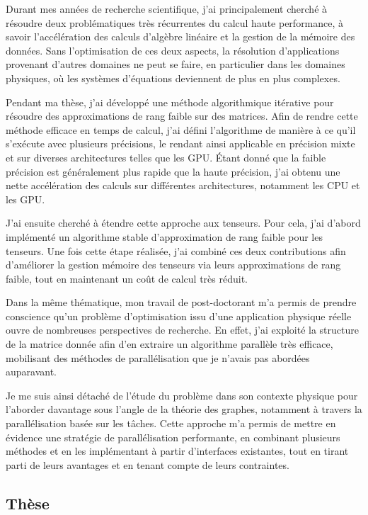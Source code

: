 
\noindent Durant mes années de recherche scientifique, j'ai principalement cherché à
résoudre deux problématiques très récurrentes du calcul haute performance, à
savoir l'accélération des calculs d'algèbre linéaire et la gestion de la
mémoire des données. Sans l'optimisation de ces deux aspects, la
résolution d'applications provenant d'autres domaines ne peut se faire,
en particulier dans les domaines physiques, où les systèmes d'équations
deviennent de plus en plus complexes.

Pendant ma thèse, j'ai développé une méthode algorithmique itérative pour
résoudre des approximations de rang faible sur des matrices. Afin de rendre
cette méthode efficace en temps de calcul, j'ai défini l'algorithme de manière
à ce qu'il s'exécute avec plusieurs précisions, le rendant ainsi applicable en
précision mixte et sur diverses architectures telles que les GPU. Étant donné
que la faible précision est généralement plus rapide que la haute précision,
j'ai obtenu une nette accélération des calculs sur différentes architectures,
notamment les CPU et les GPU.

J'ai ensuite cherché à étendre cette approche aux tenseurs. Pour cela, j'ai
d'abord implémenté un algorithme stable d'approximation de rang faible pour les
tenseurs. Une fois cette étape réalisée, j'ai combiné ces deux contributions
afin d'améliorer la gestion mémoire des tenseurs via leurs approximations de
rang faible, tout en maintenant un coût de calcul très réduit.

Dans la même thématique, mon travail de post-doctorant m'a permis de prendre
conscience qu'un problème d'optimisation issu d'une application physique réelle
ouvre de nombreuses perspectives de recherche. En effet, j'ai exploité la
structure de la matrice donnée afin d'en extraire un algorithme parallèle très
efficace, mobilisant des méthodes de parallélisation que je n'avais pas
abordées auparavant.

Je me suis ainsi détaché de l'étude du problème dans son contexte physique pour
l'aborder davantage sous l'angle de la théorie des graphes, notamment à travers
la parallélisation basée sur les tâches. Cette approche m'a permis de mettre en
évidence une stratégie de parallélisation performante, en combinant plusieurs
méthodes et en les implémentant à partir d'interfaces existantes, tout en
tirant parti de leurs avantages et en tenant compte de leurs contraintes.

\subsection{Thèse}

